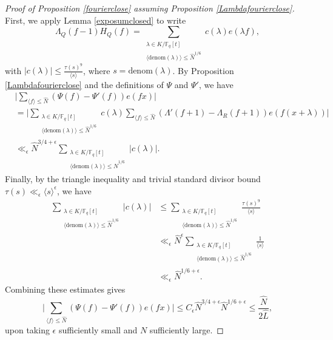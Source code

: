 \documentclass{article}
\theoremstyle{definition}
\theoremstyle{definition}
\theoremstyle{remark}
\newcommand{\F}{\mathbb{F}_q[t]}
\newcommand{\1}{\mathbf{1}}
\numberwithin{equation}{section}
\begin{document}
\begin{proof}[Proof of Proposition \ref{fourierclose} assuming Proposition \ref{Lambdafourierclose}]


First, we apply Lemma \ref{exposumclosed} to write 
\[\Lambda_Q(f-1)H_Q(f)=\sum_{\substack{\lambda\in K\slash \F\\ \langle \text{denom} (\lambda)\rangle\leq \widehat{N}^{1\slash 6}}} c(\lambda)e(\lambda f),\]
with $|c(\lambda)|\leq \frac{\tau(s)^9}{\langle s\rangle }$, where $s=\text{denom}(\lambda)$. 
By Proposition \ref{Lambdafourierclose} and the definitions of $\Psi$ and $\Psi'$, we have 
\begin{align*}
&\Bigg|\sum_{\langle f\rangle \leq \widehat{N}} (\Psi(f)-\Psi'(f))e(fx)\Bigg|\\
&=\Bigg|\sum_{\substack{\lambda\in K\slash \F\\ \langle \text{denom} (\lambda)\rangle\leq \widehat{N}^{1\slash 6}}} c(\lambda)\sum_{\langle f\rangle \leq \widehat{N}} (\Lambda'(f+1)-\Lambda_R(f+1))e(f(x+\lambda))\Bigg|\\
&\ll_\epsilon \widehat{N}^{3\slash 4+\epsilon}\sum_{\substack{\lambda\in K\slash \F\\ \langle \text{denom} (\lambda)\rangle\leq \widehat{N}^{1\slash 6}}} |c(\lambda)|.
\end{align*}
Finally, by the triangle inequality and trivial standard divisor bound $\tau(s)\ll_\epsilon \langle s \rangle ^\epsilon$, we have
\begin{align*}
\sum_{\substack{\lambda\in K\slash \F\\ \langle \text{denom} (\lambda)\rangle\leq \widehat{N}^{1\slash 6}}} |c(\lambda)|&\leq \sum_{\substack{\lambda\in K\slash \F\\ \langle \text{denom} (\lambda)\rangle\leq \widehat{N}^{1\slash 6}}} \frac{\tau(s)^9}{\langle s\rangle }\\
&\ll_\epsilon \widehat{N}^{\epsilon}\sum_{\substack{\lambda\in K\slash \F\\ \langle \text{denom} (\lambda)\rangle\leq \widehat{N}^{1\slash 6}}} \frac{1}{\langle s\rangle }\\
&\ll_\epsilon \widehat{N}^{1\slash 6+\epsilon}.
\end{align*}
Combining these estimates gives 
\[\Bigg|\sum_{\langle f\rangle \leq \widehat{N}} (\Psi(f)-\Psi'(f))e(fx)\Bigg|\leq C_\epsilon \widehat{N}^{3\slash 4+\epsilon}\widehat{N}^{1\slash 6+\epsilon}\leq \frac{\widehat{N}}{2\widehat{L}},\]
upon taking $\epsilon$ sufficiently small and $N$ sufficiently large. 
\end{proof}
\end{document}
